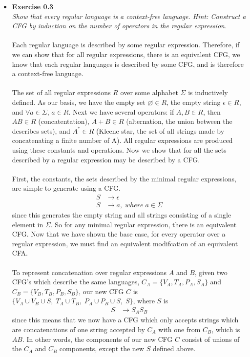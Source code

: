 \documentclass[12pt]{article}
\begin{document}
\begin{itemize}
\item{\textbf{Exercise 0.3}} \\
\emph{Show that every regular language is a context-free language. Hint: Construct a CFG by induction on the number of operators in the regular expression.
} \\
\\
Each regular language is described by some regular expression. Therefore, if we can show that for all regular expressions, there is an equivalent CFG, we know that each regular languages is described by some CFG, and is therefore a context-free language. \\
\\
The set of all regular expressions $R$ over some alphabet $\Sigma$ is inductively defined. As our basis, we have the empty set $\varnothing \in R$, the empty string $\epsilon \in R$, and $\forall a \in \Sigma$, $a \in R$. Next we have several operators: if $A, B \in R$, then $AB \in R$ (concatentation), $A+B \in R$ (alternation, the union between the describes sets), and $A^* \in R$ (Kleene star, the set of all strings made by concatenating a finite number of A). All regular expressions are produced using these constants and operations. Now we show that for all the sets described by a regular expression may be described by a CFG.\\
\\
First, the constants, the sets described by the minimal regular expressions, are simple to generate using a CFG.
\begin{align}
\nonumber S &\rightarrow \epsilon \\
\nonumber S &\rightarrow a,\; where\;a\in \Sigma
\end{align}
since this generates the empty string and all strings consisting of a single element in $\Sigma$. So for any minimal regular expression, there is an equivalent CFG. Now that we have shown the base case, for every operator over a regular expression, we must find an equivalent modifcation of an equivalent CFA. \\
\\
To represent concatenation over regular expressions $A$ and $B$, given two CFG's which describe the same languages, $C_A=\{V_A, T_A, P_A, S_A\}$ and $C_B=\{V_B, T_B, P_B, S_B\}$, our new CFG $C$ is $\{V_A \cup V_B \cup S,\; T_A \cup T_B,\; P_A \cup P_B \cup S,\; S\}$, where $S$ is
\begin{align}
\nonumber S &\rightarrow S_AS_B
\end{align}
since this means that we now have a CFG which only accepts strings which are concatenations of one string accepted by $C_A$ with one from $C_B$, which is $AB$. In other words, the components of our new CFG $C$ consist of unions of the $C_A$ and $C_B$ components, except the new $S$ defined above. \\

\end{itemize}
\end{document}
